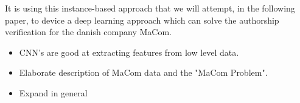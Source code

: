 It is using this instance-based approach that we will attempt, in the following
paper, to device a deep learning approach which can solve the authorship
verification for the danish company MaCom.


\begin{itemize}
    \item CNN's are good at extracting features from low level data.
    \item Elaborate description of MaCom data and the "MaCom Problem".
    \item Expand in general
\end{itemize}
